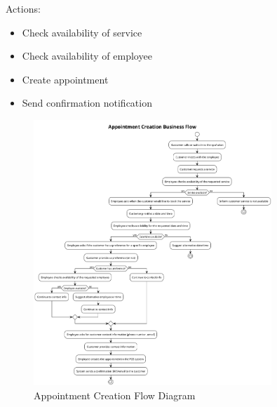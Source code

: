 \documentclass[]{VUMIFTemplateClass}
\begin{document}
Actions:
\begin{itemize}
    \setlength{\itemsep}{2pt}
    \setlength{\parskip}{0pt}
    \setlength{\parsep}{0pt}
    \item Check availability of service
    \item Check availability of employee
    \item Create appointment
    \item Send confirmation notification
\end{itemize}

\begin{figure}[H]
    \centering
    \includegraphics[width=0.8\textwidth]{images/diagrams/services/appointment_creation_flow.png}
    \caption{Appointment Creation Flow Diagram}
    \label{fig:appointment_creation_flow}
\end{figure}
\end{document}
